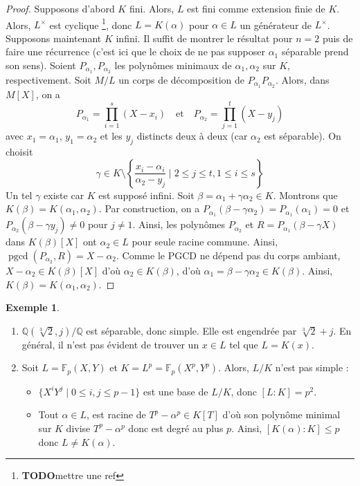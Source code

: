 \documentclass{article}
\newcommand{\Q}{\mathbb{Q}}
\newcommand{\F}{\mathbb{F}}
\DeclareMathOperator{\pgcd}{pgcd}
\newcommand{\todo}{\textbf{TODO}}
\theoremstyle{plain}
\theoremstyle{definition}
\newtheorem{example}[theorem]{Exemple}
\theoremstyle{remark}
\begin{document}
\begin{proof}
    Supposons d'abord $K$ fini. Alors, $L$ est fini comme extension finie de $K$. Alors, $L^\times$ est cyclique \footnote{\todo mettre une ref}, donc $L = K(\alpha)$ pour $\alpha \in L$ un générateur de $L^\times$. \\
    Supposons maintenant $K$ infini. Il suffit de montrer le résultat pour $n=2$ puis de faire une récurrence (c'est ici que le choix de ne pas supposer $\alpha_1$ séparable prend son sens). Soient $P_{\alpha_1}, P_{\alpha_2}$ les polynômes minimaux de $\alpha_1,\alpha_2$ sur $K$, respectivement. Soit $M/L$ un corps de décomposition de $P_{\alpha_1}P_{\alpha_2}$. Alors, dans $M[X]$, on a
    \[P_{\alpha_1} = \prod_{i=1}^s (X-x_i) \quad \text{et} \quad P_{\alpha_2} = \prod_{j=1}^t (X-y_j) \]
    avec $x_1 = \alpha_1$, $y_1 = \alpha_2$ et les $y_j$ distincts deux à deux (car $\alpha_2$ est séparable). On choisit
    \[\gamma \in K \setminus \left\{\frac{x_i-\alpha_i}{\alpha_2-y_j} \; \Big| \; 2 \le j \le t, 1 \le i \le s \right\}\]
    Un tel $\gamma$ existe car $K$ est supposé infini. Soit $\beta = \alpha_1 + \gamma \alpha_2 \in K$. Montrons que $K(\beta) = K(\alpha_1,\alpha_2)$. Par construction, on a $P_{\alpha_1} (\beta - \gamma \alpha_2) = P_{\alpha_1} (\alpha_1) = 0$ et $P_{\alpha_2} (\beta - \gamma y_j) \ne 0$ pour $j \ne 1$. Ainsi, les polynômes $P_{\alpha_2}$ et $R = P_{\alpha_1} (\beta - \gamma X)$ dans $K(\beta)[X]$ ont $\alpha_2 \in L$ pour seule racine commune. Ainsi, $\pgcd(P_{\alpha_2},R) = X-\alpha_2$. Comme le PGCD ne dépend pas du corps ambiant, $X-\alpha_2 \in K(\beta)[X]$ d'où $\alpha_2 \in K(\beta)$, d'où $\alpha_1 = \beta - \gamma\alpha_2 \in K(\beta)$. Ainsi, $K(\beta) = K(\alpha_1,\alpha_2)$.
\end{proof}

\begin{example} \leavevmode
    \begin{enumerate}
        \item $\Q(\sqrt[3]{2},j)/\Q$ est séparable, donc simple. Elle est engendrée par $\sqrt[3]{2} + j$. En général, il n'est pas évident de trouver un $x \in L$ tel que $L = K(x)$.
        \item Soit $L = \F_p (X,Y)$ et $K = L^p = \F_p(X^p,Y^p)$. Alors, $L/K$ n'est pas simple :
        \begin{itemize}
            \item $\{X^i Y^j \mid 0\le i,j\le p-1\}$ est une base de $L/K$, donc $[L : K] = p^2$.
            \item Tout $\alpha \in L$, est racine de $T^p - \alpha^p \in K[T]$ d'où son polynôme minimal sur $K$ divise $T^p - \alpha^p$ donc est degré au plus $p$. Ainsi, $[K(\alpha) : K] \le p$ donc $L \ne K(\alpha)$.
        \end{itemize}
    \end{enumerate}
\end{example}
\end{document}
